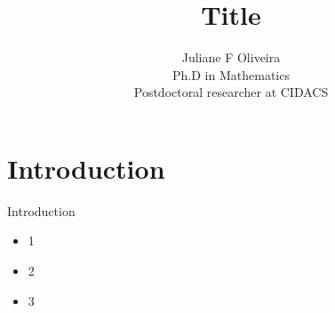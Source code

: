 \documentclass[bigger]{beamer}
\title{\color{black} \textbf{Title}}
\author{Juliane F Oliveira \\ Ph.D in Mathematics \\ Postdoctoral researcher at CIDACS}
\begin{document}
   
   \begin{frame}[plain]
    \vspace{2.5cm}
    \maketitle
   \end{frame}

    \section{Introduction}

{
%
\begin{frame}{ Introduction}
\begin{itemize}
\item 1
\item 2
\item 3
\end{itemize}
\end{frame}
}

{
%
\begin{frame}{ }

\end{frame}
}
\end{document}
